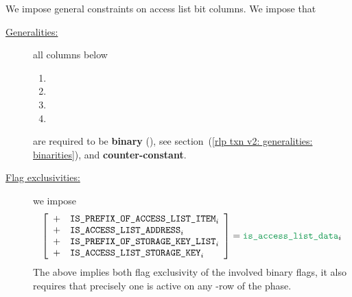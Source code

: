 We impose general constraints on access list bit columns.
We impose that
\begin{description}
    \item[\underline{Generalities:}]
	all columns below
	\begin{multicols}{2}
	    \begin{enumerate}
		\item \rlpTxnSharedColumnIsPrefixOfAccessListItem
		\item \rlpTxnSharedColumnIsPrefixOfStorageKeyList
		\item \rlpTxnSharedColumnIsAccessListAddress
		\item \rlpTxnSharedColumnIsAccessListStorageKey
	    \end{enumerate}
	\end{multicols}
	are required to be \textbf{binary} (\sanityCheck),
	see section~(\ref{rlp txn v2: generalities: binarities}),
	and \textbf{counter-constant}.
    \item[\underline{Flag exclusivities:}]
	we impose
	\[
	    \left[ \begin{array}{cl}
		+ & \rlpTxnSharedColumnIsPrefixOfAccessListItem _{i} \\
		+ & \rlpTxnSharedColumnIsAccessListAddress      _{i} \\
		+ & \rlpTxnSharedColumnIsPrefixOfStorageKeyList _{i} \\
		+ & \rlpTxnSharedColumnIsAccessListStorageKey   _{i} \\
	    \end{array} \right]
	    = \locAccessListData _{i}
	\]
	\saNote{}
	The above implies both flag exclusivity of the involved binary flags,
	it also requires that precisely one is active on any \locAccessListData{}-row
	of the \phaseAccessList{} phase.

\end{description}
